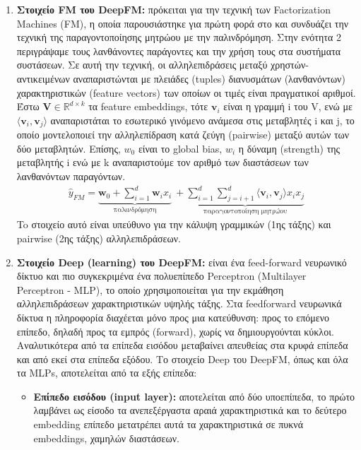 \begin{enumerate}
	\item \textbf{Στοιχείο FM του DeepFM:} πρόκειται για την τεχνική των Factorization Machines (FM), η οποία παρουσιάστηκε για πρώτη φορά στο \cite{rendleFactorizationMachines2010} και συνδυάζει την τεχνική της παραγοντοποίησης μητρώου με την παλινδρόμηση. Στην ενότητα 2 περιγράψαμε τους λανθάνοντες παράγοντες και την χρήση τους στα συστήματα συστάσεων. Σε αυτή την τεχνική, οι αλληλεπιδράσεις μεταξύ χρηστών-αντικειμένων αναπαριστώνται με πλειάδες (tuples) διανυσμάτων (λανθανόντων) χαρακτηριστικών (feature vectors) των οποίων οι τιμές είναι πραγματικοί αριθμοί. Έστω $ \mathbf{V} \in \mathbb{R}^{d\times k}  $ τα feature embeddings, τότε $ \mathbf{v}_{i} $ είναι η γραμμή i του V, ενώ με $  \langle \mathbf{v}_i, \mathbf{v}_j \rangle $ αναπαριστάται το εσωτερικό γινόμενο ανάμεσα στις μεταβλητές i και j, το οποίο μοντελοποιεί την αλληλεπίδραση κατά ζεύγη (pairwise) μεταξύ αυτών των δύο μεταβλητών. Επίσης, $ w_{0} $ είναι το global bias, $ w_{i} $ η δύναμη (strength) της μεταβλητής i ενώ με k αναπαριστούμε τον αριθμό των διαστάσεων των λανθανόντων παραγόντων.
	 \begin{align}		
	 \hat{y}_{FM} = \underbrace{\mathbf{w}_0 + \sum_{i=1}^d \mathbf{w}_i x_i }_{\text{παλινδρόμηση}} \:+\underbrace {\sum_{i=1}^d\sum_{j=i+1}^d \langle\mathbf{v}_i, \mathbf{v}_j\rangle x_i x_j}_{\text{παραγοντοποίηση μητρώου}}
    \end{align}
    To στοιχείο αυτό είναι υπεύθυνο για την κάλυψη γραμμικών (1ης τάξης) και pairwise (2ης τάξης) αλληλεπιδράσεων.
	\item\textbf{Στοιχείο Deep (learning) του DeepFM:} είναι ένα feed-forward νευρωνικό δίκτυο \cite{hoffmannSimulationNeuronalerNetze1992} και πιο συγκεκριμένα ένα πολυεπίπεδο Perceptron (Multilayer Perceptron - MLP), το οποίο χρησιμοποιείται για την εκμάθηση αλληλεπιδράσεων χαρακτηριστικών υψηλής τάξης. Στα feedforward νευρωνικά δίκτυα η πληροφορία διαχέεται μόνο προς μια κατεύθυνση: προς το επόμενο επίπεδο, δηλαδή προς τα εμπρός (forward), χωρίς να δημιουργούνται κύκλοι. Αναλυτικότερα από τα επίπεδα εισόδου μεταβαίνει απευθείας στα κρυφά επίπεδα και από εκεί στα επίπεδα εξόδου. Το στοιχείο Deep του DeepFM, όπως και όλα τα MLPs, αποτελείται από τα εξής επίπεδα:\begin{itemize}
		\item \textbf{Επίπεδο εισόδου (input layer):} αποτελείται από δύο υποεπίπεδα, το πρώτο λαμβάνει ως είσοδο τα ανεπεξέργαστα αραιά χαρακτηριστικά και το δεύτερο embedding επίπεδο μετατρέπει αυτά τα χαρακτηριστικά σε πυκνά embeddings, χαμηλών διαστάσεων.

\end{itemize}
\end{enumerate}
